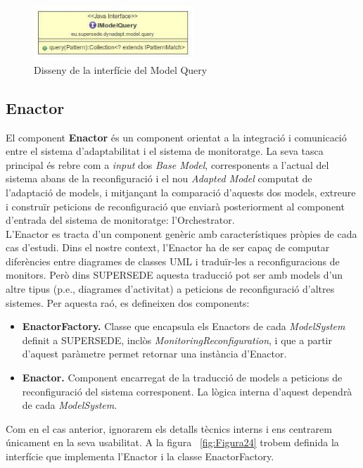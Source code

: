 \begin{figure}
\centering
\includegraphics[width=6cm]{Figures/Figure23}
\decoRule
\caption{Disseny de la interfície del Model Query}
\label{fig:Figura23}
\end{figure}

\subsection{Enactor}

El component \textbf{Enactor} és un component orientat a la integració i comunicació entre el sistema d'adaptabilitat i el sistema de monitoratge. La seva tasca principal és rebre com a \textit{input} dos \textit{Base Model}, corresponents a l'actual del sistema abans de la reconfiguració i el nou \textit{Adapted Model} computat de l'adaptació de models, i mitjançant la comparació d'aquests dos models, extreure i construïr peticions de reconfiguració que enviarà posteriorment al component d'entrada del sistema de monitoratge: l'Orchestrator.\\

L'Enactor es tracta d'un component genèric amb característiques pròpies de cada cas d'estudi. Dins el nostre context, l'Enactor ha de ser capaç de computar diferències entre diagrames de classes UML i traduïr-les a reconfiguracions de monitors. Però dins SUPERSEDE aquesta traducció pot ser amb models d'un altre tipus (p.e., diagrames d'activitat) a peticions de reconfiguració d'altres sistemes. Per aquesta raó, es defineixen dos components:

\begin{itemize}
\item \textbf{EnactorFactory.} Classe que encapsula els Enactors de cada \textit{ModelSystem} definit a SUPERSEDE, inclòs \textit{MonitoringReconfiguration}, i que a partir d'aquest paràmetre permet retornar una instància d'Enactor.
\item \textbf{Enactor.} Component encarregat de la traducció de models a peticions de reconfiguració del sistema corresponent. La lògica interna d'aquest dependrà de cada \textit{ModelSystem}.
\end{itemize}

Com en el cas anterior, ignorarem els detalls tècnics interns i ens centrarem únicament en la seva usabilitat. A la figura ~\ref{fig:Figura24} trobem definida la interfície que implementa l'Enactor i la classe EnactorFactory.

